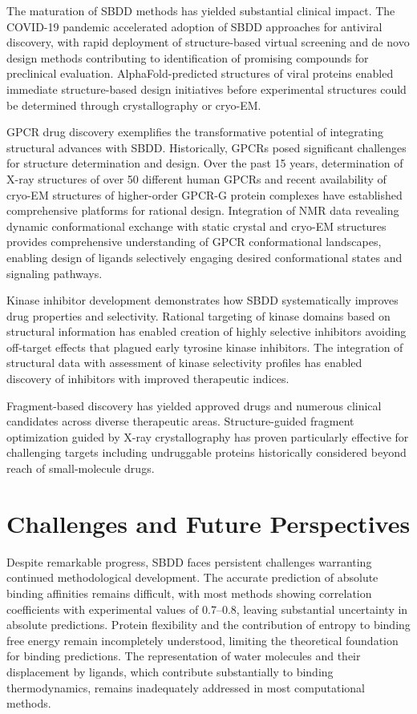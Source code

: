 \documentclass[12pt,a4paper]{article}
\begin{document}
The maturation of SBDD methods has yielded substantial clinical impact. The COVID-19 pandemic accelerated adoption of SBDD approaches for antiviral discovery, with rapid deployment of structure-based virtual screening and de novo design methods contributing to identification of promising compounds for preclinical evaluation. AlphaFold-predicted structures of viral proteins enabled immediate structure-based design initiatives before experimental structures could be determined through crystallography or cryo-EM.

GPCR drug discovery exemplifies the transformative potential of integrating structural advances with SBDD. Historically, GPCRs posed significant challenges for structure determination and design. Over the past 15 years, determination of X-ray structures of over 50 different human GPCRs and recent availability of cryo-EM structures of higher-order GPCR-G protein complexes have established comprehensive platforms for rational design. Integration of NMR data revealing dynamic conformational exchange with static crystal and cryo-EM structures provides comprehensive understanding of GPCR conformational landscapes, enabling design of ligands selectively engaging desired conformational states and signaling pathways.

Kinase inhibitor development demonstrates how SBDD systematically improves drug properties and selectivity. Rational targeting of kinase domains based on structural information has enabled creation of highly selective inhibitors avoiding off-target effects that plagued early tyrosine kinase inhibitors. The integration of structural data with assessment of kinase selectivity profiles has enabled discovery of inhibitors with improved therapeutic indices.

Fragment-based discovery has yielded approved drugs and numerous clinical candidates across diverse therapeutic areas. Structure-guided fragment optimization guided by X-ray crystallography has proven particularly effective for challenging targets including undruggable proteins historically considered beyond reach of small-molecule drugs.

\section*{Challenges and Future Perspectives}

Despite remarkable progress, SBDD faces persistent challenges warranting continued methodological development. The accurate prediction of absolute binding affinities remains difficult, with most methods showing correlation coefficients with experimental values of 0.7–0.8, leaving substantial uncertainty in absolute predictions. Protein flexibility and the contribution of entropy to binding free energy remain incompletely understood, limiting the theoretical foundation for binding predictions. The representation of water molecules and their displacement by ligands, which contribute substantially to binding thermodynamics, remains inadequately addressed in most computational methods.
\end{document}
